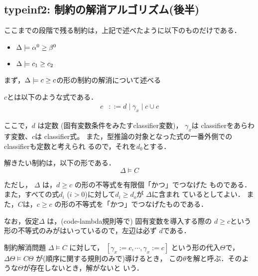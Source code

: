 \subsection{typeinf2: 制約の解消アルゴリズム(後半)}
ここまでの段階で残る制約は，上記で述べたように以下のものだけである．
\begin{itemize}
\item $\Delta \models {\alpha^0} \ge {\beta^0}$
\item $\Delta \models {c_1} \ge {c_2}$
\end{itemize}

まず，$\Delta \models {c} \ge {c}$の形の制約の解消について述べる

$c$とは以下のような式である．
\begin{align*}
  c & ::= d \mid \gamma_x \mid c \cup c
\end{align*}

ここで，$d$ は定数 (固有変数条件をみたすclassifier変数)， $\gamma_x$は
classifierをあらわす変数、$c$は classifier式。
また，型推論の対象となった式の一番外側でのclassifierも定数と考えられ
るので，それを$d_0$とする．


解きたい制約は，以下の形である．
\[
  \Delta \models C
\]

ただし， $\Delta$ は，$d \ge c$ の形の不等式を有限個「かつ」でつなげた
ものである．
また，すべての式$d_i$ ($i>0$)に対して$d_i \ge d_o$が $\Delta$に含まれ
ているとしてよい．
また，$C$は，$c \ge c$ の形の不等式を「かつ」でつなげたものである．

なお，仮定$\Delta$ は，(code-lambda規則等で) 固有変数を導入する際の
$d \ge c$という形の不等式のみがはいっているので，左辺は必ず $d$である．

制約解消問題 $ \Delta \models C $ に対して，
$[\gamma_x := c,\cdots,\gamma_x:=c]$ という形の代入$\Theta$で，
$ \Delta\Theta \models C\Theta $ が(順序に関する規則のみで)導けるとき，
この$\theta$を解と呼ぶ．そのような$\Theta$が存在しないとき，解がないと
いう．


